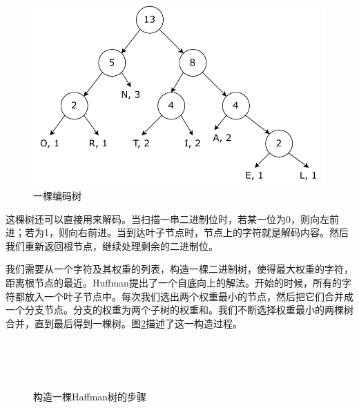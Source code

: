 \documentclass[b5paper]{ctexart}
\begin{document}
\begin{figure}[htbp]
 \centering
 \includegraphics[scale=0.5]{img/huffman-tr}
 \caption{一棵编码树}
 \label{fig:huffman-tr}
\end{figure}

这棵树还可以直接用来解码。当扫描一串二进制位时，若某一位为0，则向左前进；若为1，则向右前进。当到达叶子节点时，节点上的字符就是解码内容。然后我们重新返回根节点，继续处理剩余的二进制位。

我们需要从一个字符及其权重的列表，构造一棵二进制树，使得最大权重的字符，距离根节点的最近。Huffman提出了一个自底向上的解法。开始的时候，所有的字符都放入一个叶子节点中。每次我们选出两个权重最小的节点，然后把它们合并成一个分支节点。分支的权重为两个子树的权重和。我们不断选择权重最小的两棵树合并，直到最后得到一棵树。图\ref{fig:huffman-build}描述了这一构造过程。

\captionsetup[subfigure]{labelformat=empty, margin=10pt}
\begin{figure}[htbp]
 \centering
  \\
  \\
  \\
 \caption{构造一棵Haffman树的步骤}
 \label{fig:huffman-build}
\end{figure}
\captionsetup[subfigure]{labelformat=parens}
\end{document}

